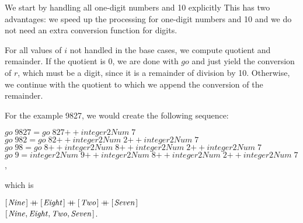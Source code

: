 \documentclass{scrreprt}
\newcommand{\Conid}[1]{\mathit{#1}}
\newcommand{\Varid}[1]{\mathit{#1}}
\newcommand{\plus}{\mathbin{+\!\!\!+}}
\begin{document}
We start by handling all one-digit numbers
and 10 explicitly 
This has two advantages:
we speed up the processing for one-digit numbers and 10
and we do not need an extra conversion function for digits.

For all values of \ensuremath{\Varid{i}} not handled in the base cases,
we compute quotient and remainder.
If the quotient is 0, we are done with \ensuremath{\Varid{go}} 
and just yield the conversion of \ensuremath{\Varid{r}},
which must be a digit, since it is a remainder of division by 10.
Otherwise, we continue with the quotient
to which we append the conversion of the remainder.

For the example \num{9827},
we would create the following sequence:

\ensuremath{\Varid{go}\;\mathrm{9827}\mathrel{=}\Varid{go}\;\mathrm{827}\plus \Varid{integer2Num}\;\mathrm{7}}\\
\ensuremath{\Varid{go}\;\mathrm{982}\mathrel{=}\Varid{go}\;\mathrm{82}\plus \Varid{integer2Num}\;\mathrm{2}\plus \Varid{integer2Num}\;\mathrm{7}}\\
\ensuremath{\Varid{go}\;\mathrm{98}\mathrel{=}\Varid{go}\;\mathrm{8}\plus \Varid{integer2Num}\;\mathrm{8}\plus \Varid{integer2Num}\;\mathrm{2}\plus \Varid{integer2Num}\;\mathrm{7}}\\
\ensuremath{\Varid{go}\;\mathrm{9}\mathrel{=}\Varid{integer2Num}\;\mathrm{9}\plus \Varid{integer2Num}\;\mathrm{8}\plus \Varid{integer2Num}\;\mathrm{2}\plus \Varid{integer2Num}\;\mathrm{7}},

which is 

\ensuremath{[\mskip1.5mu \Conid{Nine}\mskip1.5mu]\plus [\mskip1.5mu \Conid{Eight}\mskip1.5mu]\plus [\mskip1.5mu \Conid{Two}\mskip1.5mu]\plus [\mskip1.5mu \Conid{Seven}\mskip1.5mu]}\\
\ensuremath{[\mskip1.5mu \Conid{Nine},\Conid{Eight},\Conid{Two},\Conid{Seven}\mskip1.5mu]}.
\end{document}
